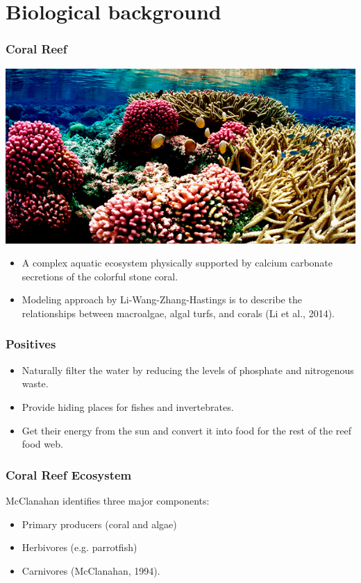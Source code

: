 
\section{Biological background}

\begin{frame}
\frametitle{Coral Reef}
\includegraphics[scale=.175]{./US-Wildlife-coral-1.jpg}
\begin{itemize}
\item A complex aquatic ecosystem physically supported by calcium carbonate secretions of the colorful stone coral. \\
\item Modeling approach by Li-Wang-Zhang-Hastings is to describe the relationships between macroalgae, algal turfs, and corals (Li et al., 2014).
\end{itemize}
\end{frame}

\begin{frame}
\frametitle{Positives}
\begin{itemize}
\item Naturally filter the water by reducing the levels of phosphate and nitrogenous waste.
\item Provide hiding places for fishes and invertebrates.
\item Get their energy from the sun and convert it into food for the rest of the reef food web. 
\end{itemize}
\end{frame}

\begin{frame}
\frametitle{Coral Reef Ecosystem} 

McClanahan identifies three major components:
\begin{itemize}
\item Primary producers (coral and algae)\\
\item Herbivores (e.g. parrotfish)\\
\item Carnivores (McClanahan, 1994).
\end{itemize}
\end{frame}

